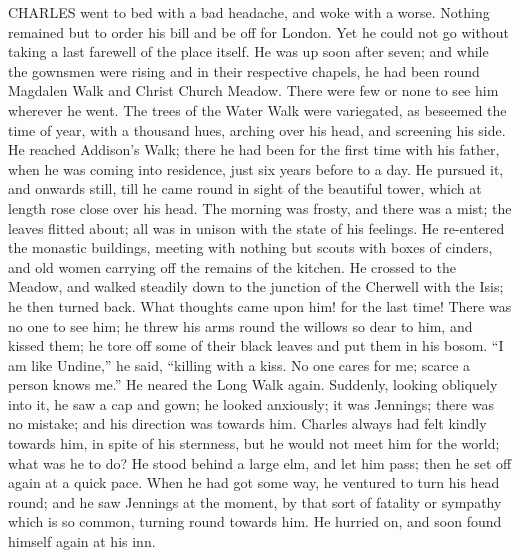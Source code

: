 CHARLES went to bed with a bad
headache, and woke with a worse. Nothing remained but to order his
bill and be off for London. Yet he could not go without taking a last
farewell of the place itself. He was up soon after seven; and while
the gownsmen were rising and in their respective chapels, he had been
round Magdalen Walk and Christ Church Meadow. There were few or none
to see him wherever he went. The trees of the Water Walk were
variegated, as beseemed the time of year, with a thousand hues,
arching over his head, and screening his side. He reached Addison's
Walk; there he had been for the first time with his father, when he
was coming into residence, just six years before to a day. He pursued
it, and onwards still, till he came round in sight of the beautiful
tower, which at length rose close over his head. The morning was
frosty, and there was a mist; the leaves flitted about; all was in
unison with the state of his feelings. He re-entered the monastic
buildings, meeting with nothing but scouts with boxes of cinders, and
old women carrying off the remains of the kitchen. He crossed to the
Meadow, and walked steadily down to the junction of the Cherwell
with the Isis; he then turned back. What thoughts came upon him! for
the last time! There was no one to see him; he threw his arms round
the willows so dear to him, and kissed them; he tore off some of their
black leaves and put them in his bosom. ``I am like Undine,''
he said, ``killing with a kiss. No one cares for me; scarce a
person knows me.'' He neared the Long Walk again. Suddenly,
looking obliquely into it, he saw a cap and gown; he looked anxiously;
it was Jennings; there was no mistake; and his direction was towards
him. Charles always had felt kindly towards him, in spite of his
sternness, but he would not meet him for the world; what was he to do?
He stood behind a large elm, and let him pass; then he set off again
at a quick pace. When he had got some way, he ventured to turn his
head round; and he saw Jennings at the moment, by that sort of
fatality or sympathy which is so common, turning round towards him. He
hurried on, and soon found himself again at his inn.

